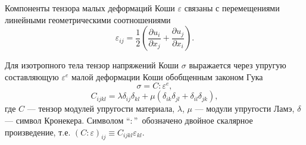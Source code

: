 Компоненты тензора малых деформаций Коши $\varepsilon$ связаны с перемещениями линейными геометрическими соотношениями
\begin{equation}
\varepsilon_{ij}=\frac{1}{2} \left(\frac{\partial u_{i}}{\partial x_{j}} + \frac{\partial u_{j}}{\partial x_{i}} \right).
\label{F:F4}
\end{equation}

Для изотропного тела тензор напряжений Коши $\sigma$ выражается через упругую составляющую $\varepsilon^{e}$ малой деформации Коши обобщенным законом Гука
\begin{equation}
\sigma=C:\varepsilon^{e},
\label{F:F_Hook}
\end{equation}
\begin{equation}
C_{ijkl}=\lambda\delta_{ij}\delta_{kl}+\mu\left(\delta_{ik}\delta_{jl}+\delta_{il}\delta_{jk}\right),
\label{F:F5}
\end{equation}
где $C$ --- тензор модулей упругости материала, $\lambda$, $\mu$ --- модули упругости Ламэ, $\delta$ --- символ Кронекера. Символом \textquotedblleft $:$\textquotedblright\ обозначено двойное скалярное произведение, т.е. $\left(C:\varepsilon\right)_{ij}\equiv C_{ijkl}\varepsilon_{kl}$.

